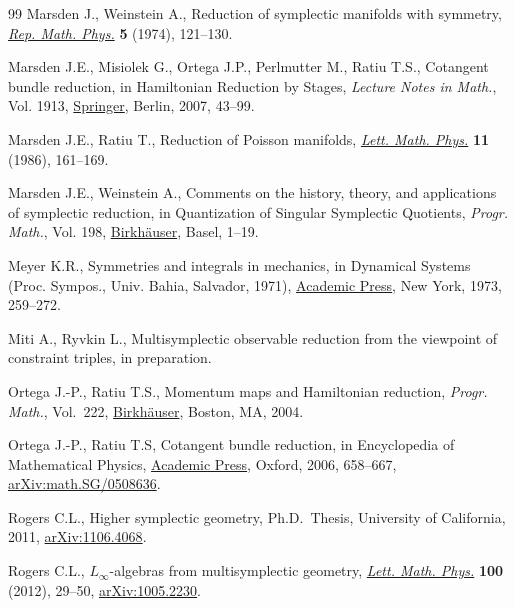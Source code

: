 \documentclass[pdftex]{sigma}
\numberwithin{equation}{section}
\begin{document}
\begin{thebibliography}{99}
Marsden J., Weinstein A., Reduction of symplectic manifolds with symmetry,
  \href{https://doi.org/10.1016/0034-4877(74)90021-4}{\textit{Rep. Math. Phys.}} \textbf{5} (1974), 121--130.

Marsden J.E., Misiolek G., Ortega J.P., Perlmutter M., Ratiu T.S., Cotangent
  bundle reduction, in Hamiltonian Reduction by Stages, \textit{Lecture Notes
  in Math.}, Vol. 1913, \href{https://doi.org/10.1007/978-3-540-72470-4_2}{Springer}, Berlin, 2007, 43--99.

Marsden J.E., Ratiu T., Reduction of {P}oisson manifolds, \href{https://doi.org/10.1007/BF00398428}{\textit{Lett. Math.
  Phys.}} \textbf{11} (1986), 161--169.

Marsden J.E., Weinstein A., Comments on the history, theory, and applications
  of symplectic reduction, in Quantization of Singular Symplectic Quotients,
  \textit{Progr. Math.}, Vol. 198, \href{https://doi.org/10.1007/978-3-0348-8364-1_1}{Birkh\"auser}, Basel, 1--19.

Meyer K.R., Symmetries and integrals in mechanics, in Dynamical Systems
  ({P}roc. {S}ympos., {U}niv. {B}ahia, {S}alvador, 1971), \href{https://doi.org/10.1016/B978-0-12-550350-1.50025-4}{Academic Press}, New
  York, 1973, 259--272.

Miti A., Ryvkin L., Multisymplectic observable reduction from the viewpoint of
  constraint triples, in preparation.

Ortega J.-P., Ratiu T.S., Momentum maps and {H}amiltonian reduction,
  \textit{Progr. Math.}, Vol.~222, \href{https://doi.org/10.1007/978-1-4757-3811-7}{Birkh\"auser}, Boston, MA, 2004.

Ortega J.-P., Ratiu T.S, Cotangent bundle reduction, in Encyclopedia of
  Mathematical Physics, \href{https://doi.org/10.1016/B0-12-512666-2/00501-0}{Academic Press}, Oxford, 2006, 658--667,
  \href{https://arxiv.org/abs/math.SG/0508636}{arXiv:math.SG/0508636}.

Rogers C.L., Higher symplectic geometry, Ph.D.~Thesis, {U}niversity of
  {C}alifornia, 2011, \href{https://arxiv.org/abs/1106.4068}{arXiv:1106.4068}.

Rogers C.L., $L_\infty$-algebras from multisymplectic geometry, \href{https://doi.org/10.1007/s11005-011-0493-x}{\textit{Lett.
  Math. Phys.}} \textbf{100} (2012), 29--50, \href{https://arxiv.org/abs/1005.2230}{arXiv:1005.2230}.


\end{thebibliography}
\end{document}
